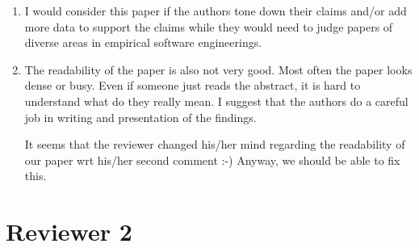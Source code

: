 \documentclass{article}
\newenvironment{com}{\color{blue}\begin{itshape}}{\end{itshape}\vspace{1ex}}
\begin{document}
\begin{enumerate}
\item \begin{com}
I would consider this paper if the authors tone down their claims and/or add more data to support the claims while they would need to judge papers of diverse areas in empirical software engineerings. 
\end{com}

\item \begin{com}
The readability of the paper is also not very good. Most often the paper looks dense or busy. Even if someone just reads the abstract, it is hard to understand what do they really mean. I suggest that the authors do a careful job in writing and presentation of the findings. 
\end{com}

It seems that the reviewer changed his/her mind regarding the readability of our paper wrt his/her second comment :-) Anyway, we should be able to fix this.

\end{enumerate}

\section*{Reviewer 2}
\label{sec:Reviewer2}
\renewcommand*{\theenumi}{2.\arabic{enumi}}
\renewcommand*{\theenumii}{\theenumi.\arabic{enumii}}
\end{document}
